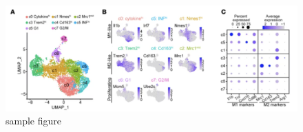 \begin{figure}[H]
    \centering
    \includegraphics[width=\textwidth,keepaspectratio]{utils/imgs/sample1.png}
    \caption{sample figure}
    \label{fig:sample_figure1}
\end{figure}
